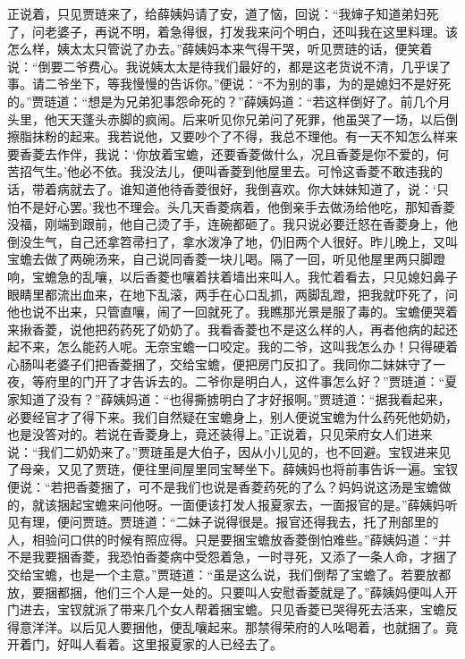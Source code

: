 \begin{parag}
    正说着，只见贾琏来了，给薛姨妈请了安，道了恼，回说：“我婶子知道弟妇死了，问老婆子，再说不明，着急得很，打发我来问个明白，还叫我在这里料理。该怎么样，姨太太只管说了办去。”薛姨妈本来气得干哭，听见贾琏的话，便笑着说：“倒要二爷费心。我说姨太太是待我们最好的，都是这老货说不清，几乎误了事。请二爷坐下，等我慢慢的告诉你。”便说：“不为别的事，为的是媳妇不是好死的。”贾琏道：“想是为兄弟犯事怨命死的？”薛姨妈道：“若这样倒好了。前几个月头里，他天天蓬头赤脚的疯闹。后来听见你兄弟问了死罪，他虽哭了一场，以后倒擦脂抹粉的起来。我若说他，又要吵个了不得，我总不理他。有一天不知怎么样来要香菱去作伴，我说：‘你放着宝蟾，还要香菱做什么，况且香菱是你不爱的，何苦招气生。’他必不依。我没法儿，便叫香菱到他屋里去。可怜这香菱不敢违我的话，带着病就去了。谁知道他待香菱很好，我倒喜欢。你大妹妹知道了，说：‘只怕不是好心罢。’我也不理会。头几天香菱病着，他倒亲手去做汤给他吃，那知香菱没福，刚端到跟前，他自己烫了手，连碗都砸了。我只说必要迁怒在香菱身上，他倒没生气，自己还拿笤帚扫了，拿水泼净了地，仍旧两个人很好。昨儿晚上，又叫宝蟾去做了两碗汤来，自己说同香菱一块儿喝。隔了一回，听见他屋里两只脚蹬响，宝蟾急的乱嚷，以后香菱也嚷着扶着墙出来叫人。我忙着看去，只见媳妇鼻子眼睛里都流出血来，在地下乱滚，两手在心口乱抓，两脚乱蹬，把我就吓死了，问他也说不出来，只管直嚷，闹了一回就死了。我瞧那光景是服了毒的。宝蟾便哭着来揪香菱，说他把药药死了奶奶了。我看香菱也不是这么样的人，再者他病的起还起不来，怎么能药人呢。无奈宝蟾一口咬定。我的二爷，这叫我怎么办！只得硬着心肠叫老婆子们把香菱捆了，交给宝蟾，便把房门反扣了。我同你二妹妹守了一夜，等府里的门开了才告诉去的。二爷你是明白人，这件事怎么好？”贾琏道：“夏家知道了没有？”薛姨妈道：“也得撕掳明白了才好报啊。”贾琏道：“据我看起来，必要经官才了得下来。我们自然疑在宝蟾身上，别人便说宝蟾为什么药死他奶奶，也是没答对的。若说在香菱身上，竟还装得上。”正说着，只见荣府女人们进来说：“我们二奶奶来了。”贾琏虽是大伯子，因从小儿见的，也不回避。宝钗进来见了母亲，又见了贾琏，便往里间屋里同宝琴坐下。薛姨妈也将前事告诉一遍。宝钗便说：“若把香菱捆了，可不是我们也说是香菱药死的了么？妈妈说这汤是宝蟾做的，就该捆起宝蟾来问他呀。一面便该打发人报夏家去，一面报官的是。”薛姨妈听见有理，便问贾琏。贾琏道：“二妹子说得很是。报官还得我去，托了刑部里的人，相验问口供的时候有照应得。只是要捆宝蟾放香菱倒怕难些。”薛姨妈道：“并不是我要捆香菱，我恐怕香菱病中受怨着急，一时寻死，又添了一条人命，才捆了交给宝蟾，也是一个主意。”贾琏道：“虽是这么说，我们倒帮了宝蟾了。若要放都放，要捆都捆，他们三个人是一处的。只要叫人安慰香菱就是了。”薛姨妈便叫人开门进去，宝钗就派了带来几个女人帮着捆宝蟾。只见香菱已哭得死去活来，宝蟾反得意洋洋。以后见人要捆他，便乱嚷起来。那禁得荣府的人吆喝着，也就捆了。竟开着门，好叫人看着。这里报夏家的人已经去了。
\end{parag}


